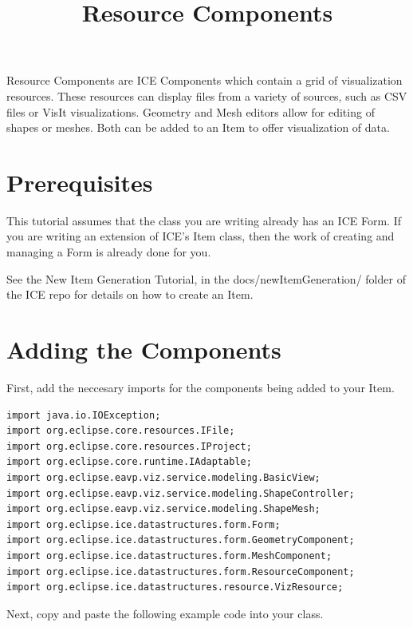\documentclass{article}
\begin{document}
\title{Resource Components}

Resource Components are ICE Components which contain a grid of visualization
resources. These resources can display files from a variety of sources,
such as CSV files or VisIt visualizations. Geometry and Mesh editors allow for
editing of shapes or meshes. Both can be added to an Item to offer visualization
of data.

\section{Prerequisites}

This tutorial assumes that the class you are writing already has an ICE Form. If
you are writing an extension of ICE's Item class, then the work of creating and
managing a Form is already done for you.

See the New Item Generation Tutorial, in the docs/newItemGeneration/ folder of 
the ICE repo for details on how to create an Item.

\section{Adding the Components}

First, add the neccesary imports for the components being added to your Item. 

\begin{verbatim}
import java.io.IOException;
import org.eclipse.core.resources.IFile;
import org.eclipse.core.resources.IProject;
import org.eclipse.core.runtime.IAdaptable;
import org.eclipse.eavp.viz.service.modeling.BasicView;
import org.eclipse.eavp.viz.service.modeling.ShapeController;
import org.eclipse.eavp.viz.service.modeling.ShapeMesh;
import org.eclipse.ice.datastructures.form.Form;
import org.eclipse.ice.datastructures.form.GeometryComponent;
import org.eclipse.ice.datastructures.form.MeshComponent;
import org.eclipse.ice.datastructures.form.ResourceComponent;
import org.eclipse.ice.datastructures.resource.VizResource;
\end{verbatim}

Next, copy and paste the following example code into your class.
\end{document}
